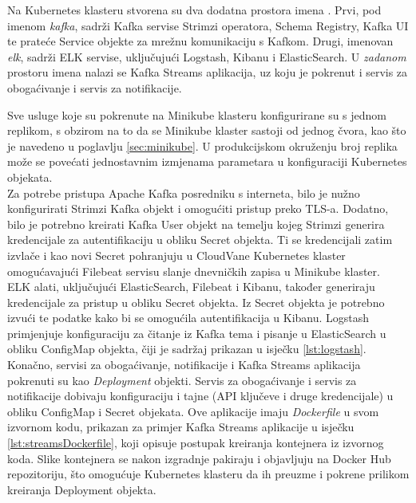 \documentclass[times, utf8, diplomski]{fer}
\begin{document}
Na Kubernetes klasteru stvorena su dva dodatna prostora imena . Prvi, pod imenom \emph{\glqq kafka\grqq}, sadrži Kafka servise Strimzi operatora, Schema Registry, Kafka UI te prateće Service objekte za mrežnu komunikaciju s Kafkom. Drugi, imenovan \emph{\glqq elk\grqq}, sadrži ELK servise, uključujući Logstash, Kibanu i ElasticSearch. U \emph{zadanom}  prostoru imena nalazi se Kafka Streams aplikacija, uz koju je pokrenut i servis za obogaćivanje i servis za notifikacije.

Sve usluge koje su pokrenute na Minikube klasteru konfigurirane su s jednom replikom, s obzirom na to da se Minikube klaster sastoji od jednog čvora, kao što je navedeno u poglavlju \ref{sec:minikube}. U produkcijskom okruženju broj replika može se povećati jednostavnim izmjenama parametara u konfiguraciji Kubernetes objekata.\\

Za potrebe pristupa Apache Kafka posredniku s interneta, bilo je nužno konfigurirati Strimzi Kafka objekt i omogućiti pristup preko TLS-a. Dodatno, bilo je potrebno kreirati Kafka User objekt na temelju kojeg Strimzi generira kredencijale za autentifikaciju u obliku Secret objekta. Ti se kredencijali zatim izvlače i kao novi Secret pohranjuju u CloudVane Kubernetes klaster omogućavajući Filebeat servisu slanje dnevničkih zapisa u Minikube klaster.\\

ELK alati, uključujući ElasticSearch, Filebeat i Kibanu, također generiraju kredencijale za pristup u obliku Secret objekta. Iz Secret objekta je potrebno izvući te podatke kako bi se omogućila autentifikacija u Kibanu. Logstash primjenjuje konfiguraciju za čitanje iz Kafka tema i pisanje u ElasticSearch u obliku ConfigMap objekta, čiji je sadržaj prikazan u isječku \ref{lst:logstash}.\\

Konačno, servisi za obogaćivanje, notifikacije i Kafka Streams aplikacija pokrenuti su kao \emph{Deployment} objekti. Servis za obogaćivanje i servis za notifikacije dobivaju konfiguraciju i tajne (API ključeve i druge kredencijale) u obliku ConfigMap i Secret objekata. Ove aplikacije imaju \emph{Dockerfile} u svom izvornom kodu, prikazan za primjer Kafka Streams aplikacije u isječku \ref{lst:streamsDockerfile}, koji opisuje postupak kreiranja kontejnera iz izvornog koda. Slike kontejnera se nakon izgradnje pakiraju i objavljuju na Docker Hub repozitoriju, što omogućuje Kubernetes klasteru da ih preuzme i pokrene prilikom kreiranja Deployment objekta.
\end{document}
